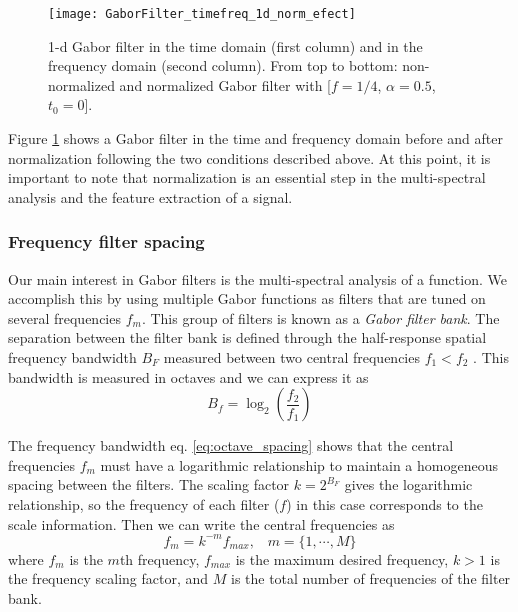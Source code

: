 \begin{figure}[!ht]
	\centering
	\texttt{[image: GaborFilter\_timefreq\_1d\_norm\_efect]}
	\caption{1-d Gabor filter in the time domain (first column) and in the frequency domain (second  column). From top to bottom: non-normalized and normalized Gabor filter with [$f =1/4$, $\alpha=0.5$, $t_0=0$].}\label{fig:GaborFilter_timefreq_norm_efect}
\end{figure}

Figure \ref{fig:GaborFilter_timefreq_norm_efect} shows a Gabor filter in the time and frequency domain before and after normalization following the two conditions described above. At this point, it is important to note that normalization is an essential step in the multi-spectral analysis and the feature extraction of a signal.

\subsubsection{Frequency filter spacing}\label{subsec:frequency_filter_spacing}
Our main interest in Gabor filters is the multi-spectral analysis of a function. We accomplish this by using multiple Gabor functions as filters that are tuned on several frequencies $f_m$. This group of filters is known as a \textit{Gabor filter bank}. The separation between the filter bank is defined through the half-response spatial frequency bandwidth $B_F$ measured between two central frequencies $f_1 < f_2$ \citep{Granlund:CGIP:1978}. This bandwidth is measured in octaves and we can express it as
\begin{equation}\label{eq:octave_spacing}
    B_f = \log_2 \left( \frac{f_2}{f_1} \right)
\end{equation}

The frequency bandwidth eq. \eqref{eq:octave_spacing} shows that the central frequencies $f_m$ must have a logarithmic relationship to maintain a homogeneous spacing between the filters. The scaling factor $k=2^{B_F}$ gives the logarithmic relationship, so the frequency of each filter ($f$) in this case corresponds to the scale information. Then we can write the central frequencies as
\begin{equation}
	f_m = k^{-m} f_{max}\textrm{,} \quad m = \{1, \cdots, M\} \label{eq:filterbank_frequencies}
\end{equation} 
where $f_m$ is the $m$th frequency, $f_{max}$ is the maximum desired frequency, $k>1$ is the frequency scaling factor, and $M$ is the total number of frequencies of the filter bank.

